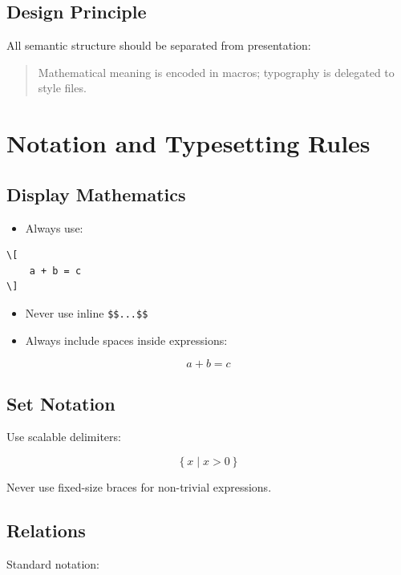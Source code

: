 \documentclass{book}
\begin{document}
\subsection{Design Principle}

All semantic structure should be separated from presentation:

\begin{quote}
Mathematical meaning is encoded in macros; typography is delegated to style files.
\end{quote}

\section{Notation and Typesetting Rules}

\subsection{Display Mathematics}

\begin{itemize}
    \item Always use:
\end{itemize}

\begin{verbatim}
\[
    a + b = c
\]
\end{verbatim}

\begin{itemize}
    \item Never use inline \texttt{\$\$...\$\$}
    \item Always include spaces inside expressions:
\end{itemize}

\[
 a + b = c
\]

\subsection{Set Notation}

Use scalable delimiters:

\[
\left\{ x \mid x > 0 \right\}
\]

Never use fixed-size braces for non-trivial expressions.

\subsection{Relations}

Standard notation:
\end{document}
